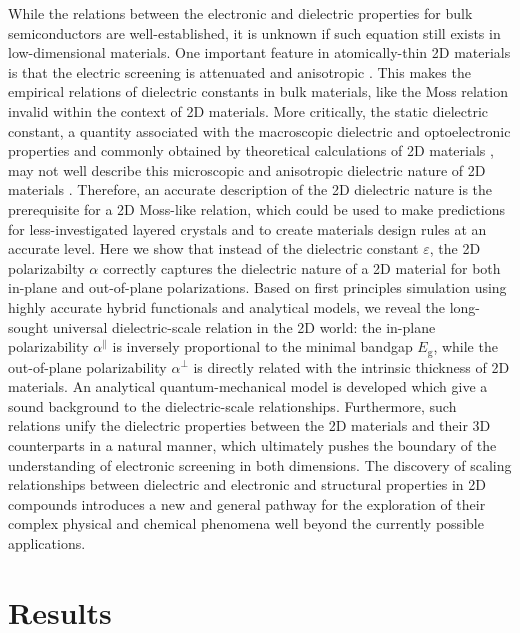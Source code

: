 \documentclass[journal=ancac3,manuscript=article,email=true,hyperref=true,keywords=false]{achemso}
\begin{document}
While the relations between the electronic and dielectric properties
for bulk semiconductors are well-established, it is unknown if such
equation still exists in low-dimensional materials. One important
feature in atomically-thin 2D materials \cite{Novoselov_2016} is that
the electric screening is attenuated and anisotropic
\cite{Keldysh_1979_eps_multi,Sharma_1985,Low_2014_screening_BP,Cudazzo_2011_screening_2D,Bechstedt_2012}. This
makes the empirical relations of dielectric constants in bulk
materials, like the Moss relation invalid within the context of 2D
materials. More critically, the static dielectric constant, a quantity
associated with the macroscopic dielectric and optoelectronic
properties and commonly obtained by theoretical calculations of 2D
materials \cite{Ramasubramaniam_2012,Wang_2016_Aip,Laturia_2018}, may
not well describe this microscopic and anisotropic dielectric nature
of 2D materials
\cite{Cudazzo_2010_screen2D,Cudazzo_2011_screening_2D}. Therefore, an
accurate description of the 2D dielectric nature is the prerequisite
for a 2D Moss-like relation, which could be used to make predictions
for less-investigated layered crystals and to create materials design
rules at an accurate level.  Here we show that instead of the
dielectric constant $\varepsilon$, the 2D polarizabilty $\alpha$
correctly captures the dielectric nature of a 2D material for both
in-plane and out-of-plane polarizations. Based on first principles
simulation using highly accurate hybrid functionals and analytical
models, we reveal the long-sought universal dielectric-scale relation
in the 2D world: the in-plane polarizability $\alpha^{\parallel}$ is
inversely proportional to the minimal bandgap $E_{\mathrm{g}}$, while
the out-of-plane polarizability $\alpha^{\perp}$ is directly related
with the intrinsic thickness of 2D materials. An analytical
quantum-mechanical model is developed which give a sound background to
the dielectric-scale relationships. Furthermore, such relations unify
the dielectric properties between the 2D materials and their 3D
counterparts in a natural manner, which ultimately pushes the boundary
of the understanding of electronic screening in both dimensions. The
discovery of scaling relationships between dielectric and electronic
and structural properties in 2D compounds introduces a new and general
pathway for the exploration of their complex physical and chemical
phenomena well beyond the currently possible applications.

\section{Results}
\label{sec:org752ca78}
\end{document}
